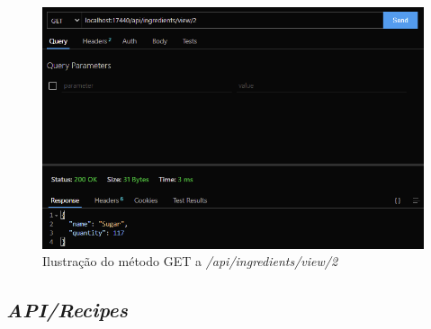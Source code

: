 \FloatBarrier
\begin{figure}[!hbt]
    \centering
    \includegraphics[width=14cm]{Resources/API/Ingredients/Ingredients (8).png}
    \caption{Ilustração do método GET a \textit{/api/ingredients/view/2}}
    
\end{figure}
\FloatBarrier

\newpage
\subsection{\textit{API/Recipes}}

